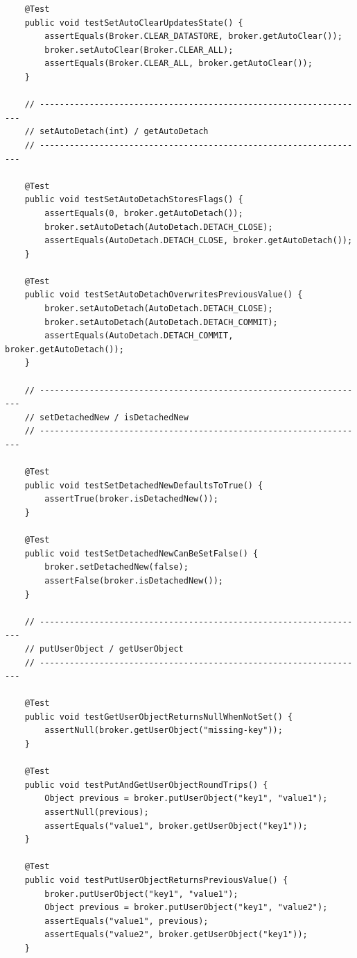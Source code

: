 \begin{lstlisting}
    @Test
    public void testSetAutoClearUpdatesState() {
        assertEquals(Broker.CLEAR_DATASTORE, broker.getAutoClear());
        broker.setAutoClear(Broker.CLEAR_ALL);
        assertEquals(Broker.CLEAR_ALL, broker.getAutoClear());
    }

    // ------------------------------------------------------------------
    // setAutoDetach(int) / getAutoDetach
    // ------------------------------------------------------------------

    @Test
    public void testSetAutoDetachStoresFlags() {
        assertEquals(0, broker.getAutoDetach());
        broker.setAutoDetach(AutoDetach.DETACH_CLOSE);
        assertEquals(AutoDetach.DETACH_CLOSE, broker.getAutoDetach());
    }

    @Test
    public void testSetAutoDetachOverwritesPreviousValue() {
        broker.setAutoDetach(AutoDetach.DETACH_CLOSE);
        broker.setAutoDetach(AutoDetach.DETACH_COMMIT);
        assertEquals(AutoDetach.DETACH_COMMIT, broker.getAutoDetach());
    }

    // ------------------------------------------------------------------
    // setDetachedNew / isDetachedNew
    // ------------------------------------------------------------------

    @Test
    public void testSetDetachedNewDefaultsToTrue() {
        assertTrue(broker.isDetachedNew());
    }

    @Test
    public void testSetDetachedNewCanBeSetFalse() {
        broker.setDetachedNew(false);
        assertFalse(broker.isDetachedNew());
    }

    // ------------------------------------------------------------------
    // putUserObject / getUserObject
    // ------------------------------------------------------------------

    @Test
    public void testGetUserObjectReturnsNullWhenNotSet() {
        assertNull(broker.getUserObject("missing-key"));
    }

    @Test
    public void testPutAndGetUserObjectRoundTrips() {
        Object previous = broker.putUserObject("key1", "value1");
        assertNull(previous);
        assertEquals("value1", broker.getUserObject("key1"));
    }

    @Test
    public void testPutUserObjectReturnsPreviousValue() {
        broker.putUserObject("key1", "value1");
        Object previous = broker.putUserObject("key1", "value2");
        assertEquals("value1", previous);
        assertEquals("value2", broker.getUserObject("key1"));
    }


\end{lstlisting}
